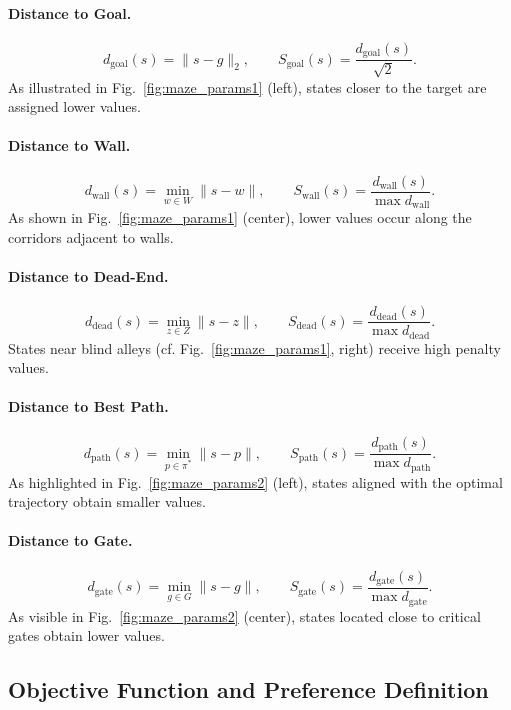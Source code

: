 \documentclass[a4paper,oneside,10pt,ngerman,english]{scrartcl}
\begin{document}
\paragraph{Distance to Goal.}
\[
d_{\text{goal}}(s) = \| s - g \|_2, 
\qquad 
S_{\text{goal}}(s) = \frac{d_{\text{goal}}(s)}{\sqrt{2}}.
\]
As illustrated in Fig.~\ref{fig:maze_params1} (left), states closer to the target are assigned lower values.

\paragraph{Distance to Wall.}
\[
d_{\text{wall}}(s) = \min_{w \in W} \| s - w \|,
\qquad 
S_{\text{wall}}(s) = \frac{d_{\text{wall}}(s)}{\max d_{\text{wall}}}.
\]
As shown in Fig.~\ref{fig:maze_params1} (center), lower values occur along the corridors adjacent to walls.

\paragraph{Distance to Dead-End.}
\[
d_{\text{dead}}(s) = \min_{z \in Z} \| s - z \|,
\qquad 
S_{\text{dead}}(s) = \frac{d_{\text{dead}}(s)}{\max d_{\text{dead}}}.
\]
States near blind alleys (cf. Fig.~\ref{fig:maze_params1}, right) receive high penalty values.

\paragraph{Distance to Best Path.}
\[
d_{\text{path}}(s) = \min_{p \in \pi^*} \| s - p \|,
\qquad 
S_{\text{path}}(s) = \frac{d_{\text{path}}(s)}{\max d_{\text{path}}}.
\]
As highlighted in Fig.~\ref{fig:maze_params2} (left), states aligned with the optimal trajectory obtain smaller values.

\paragraph{Distance to Gate.}
\[
d_{\text{gate}}(s) = \min_{g \in G} \| s - g \|,
\qquad 
S_{\text{gate}}(s) = \frac{d_{\text{gate}}(s)}{\max d_{\text{gate}}}.
\]
As visible in Fig.~\ref{fig:maze_params2} (center), states located close to critical gates obtain lower values.

\subsection{Objective Function and Preference Definition}
\end{document}
